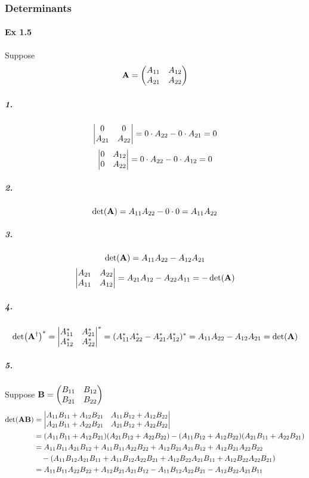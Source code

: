 \documentclass[a4paper]{article}
\newcommand{\ex}[1]{\paragraph{Ex #1}}
\newcommand{\subex}[1]{\subparagraph{#1}}
\numberwithin{equation}{section}
\begin{document}
\subsubsection{Determinants}
\ex{1.5}
Suppose 
\begin{equation}\label{key}
\vb{A} = \mqty(A_{11} & A_{12}\\A_{21} & A_{22})
\end{equation}
\subex{1.}
\begin{equation}\label{key}
\mqty|0 & 0\\A_{21} & A_{22}| = 0\cdot A_{22} - 0\cdot A_{21} = 0
\end{equation}
\begin{equation}\label{key}
\mqty|0 & A_{12}\\0 & A_{22}| = 0\cdot A_{22} - 0\cdot A_{12} = 0
\end{equation}
\subex{2.}
\begin{equation}\label{key}
\det(\vb{A}) = A_{11}A_{22} -  0\cdot 0 = A_{11}A_{22}
\end{equation}
\subex{3.}
\begin{equation}\label{key}
\det(\vb{A}) = A_{11}A_{22} -  A_{12}A_{21}
\end{equation}
\begin{equation}\label{key}
\mqty| A_{21} & A_{22}\\A_{11} & A_{12} | = A_{21}A_{12} - A_{22}A_{11} = -\det(\vb{A})
\end{equation}
\subex{4.}
\begin{equation}\label{key}
\det(\vb{A}^\dagger)^* = \mqty|A_{11}^* & A_{21}^*\\A_{12}^* & A_{22}^*|^* = (A_{11}^*A_{22}^* - A_{21}^*A_{12}^*)^* = A_{11}A_{22} -  A_{12}A_{21} = \det(\vb{A})
\end{equation}
\subex{5.}
Suppose $ \vb{B} = \mqty(B_{11} & B_{12}\\B_{21} & B_{22}) $
\begin{equation}\label{key}
\begin{aligned}
\det(\vb{A}\vb{B}) &= 
\mqty|A_{11}B_{11}+A_{12}B_{21} & A_{11}B_{12}+A_{12}B_{22}\\
A_{21}B_{11}+A_{22}B_{21} & A_{21}B_{12}+A_{22}B_{22}|\\
&= (A_{11}B_{11}+A_{12}B_{21})(A_{21}B_{12}+A_{22}B_{22}) - (A_{11}B_{12}+A_{12}B_{22})(A_{21}B_{11}+A_{22}B_{21})\\
&= A_{11}B_{11}A_{21}B_{12} + A_{11}B_{11}A_{22}B_{22} + A_{12}B_{21}A_{21}B_{12} + A_{12}B_{21}A_{22}B_{22}\\
&\quad - (A_{11}B_{12}A_{21}B_{11} +  A_{11}B_{12}A_{22}B_{21} + A_{12}B_{22}A_{21}B_{11} + A_{12}B_{22}A_{22}B_{21})\\
&= A_{11}B_{11}A_{22}B_{22} + A_{12}B_{21}A_{21}B_{12} - A_{11}B_{12}A_{22}B_{21} - A_{12}B_{22}A_{21}B_{11}
\end{aligned}
\end{equation}
\end{document}
